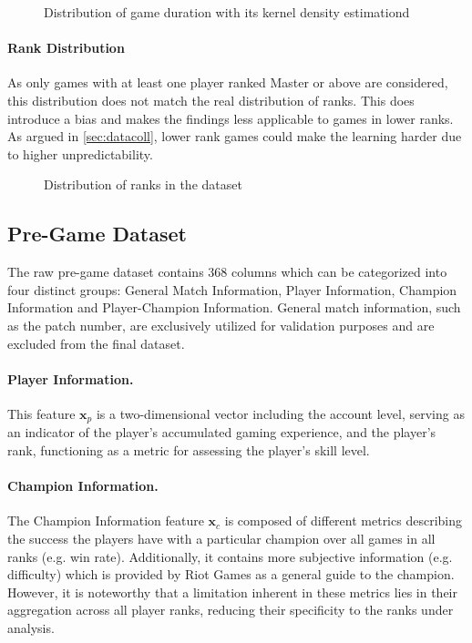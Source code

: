 \documentclass[12pt, a4paper, headinclude, twoside, plainheadsepline, open=right, numbers=noenddot, hidelinks, toc=listof, toc=bibliography]{scrreprt}
\begin{document}
\begin{figure}[ht]

\caption{Distribution of game duration with its kernel density estimationd}
\label{fig:gameDuration}
\end{figure}


\paragraph{Rank Distribution}
As only games with at least one player ranked Master or above are considered, this distribution does not match the real distribution of ranks.
This does introduce a bias and makes the findings less applicable to games in lower ranks.
As argued in \ref{sec:datacoll}, lower rank games could make the learning harder due to higher unpredictability.

\begin{figure}
\centering
\resizebox{\textwidth}{!}
{

}
\caption{Distribution of ranks in the dataset}
\label{fig:tier}
\end{figure}


\subsection{Pre-Game Dataset}
\label{ssec:pre_game_data}
The raw pre-game dataset contains $368$ columns which can be categorized into four distinct groups: General Match Information, Player Information, Champion Information and Player-Champion Information.
General match information, such as the patch number, are exclusively utilized for validation purposes and are excluded from the final dataset.

\paragraph{Player Information.}
This feature $\mathbf{x}_p$ is a two-dimensional vector including the account level, serving as an indicator of the player's accumulated gaming experience, and the player's rank, functioning as a metric for assessing the player's skill level.

\paragraph{Champion Information.}
The Champion Information feature $\mathbf{x}_c$ is composed of different metrics describing the success the players have with a particular champion over all games in all ranks (e.g. win rate).
Additionally, it contains more subjective information (e.g. difficulty) which is provided by Riot Games as a general guide to the champion.
However, it is noteworthy that a limitation inherent in these metrics lies in their aggregation across all player ranks, reducing their specificity to the ranks under analysis.
\end{document}
